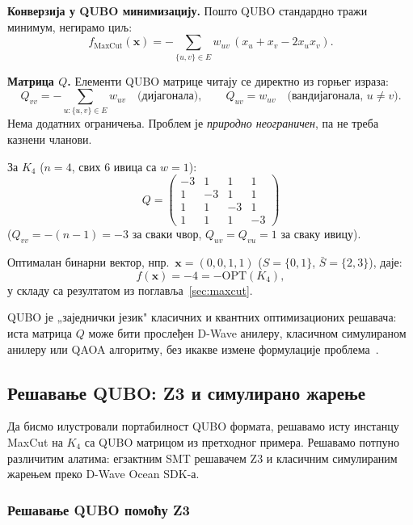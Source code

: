 \textbf{Конверзија у QUBO минимизацију.}
Пошто QUBO стандардно тражи минимум, негирамо циљ:
\[
  \boxed{
  f_{\mathrm{MaxCut}}(\mathbf{x})
  = -\sum_{\{u,v\} \in E} w_{uv}\,(x_u + x_v - 2x_u x_v).
  }
\]

\textbf{Матрица $Q$.}
Елементи QUBO матрице читају се директно из горњег израза:
\[
  Q_{vv} = -\sum_{u:\{u,v\}\in E} w_{uv}
  \quad\text{(дијагонала)},
  \qquad
  Q_{uv} = w_{uv}
  \quad\text{(ванд‌ијагонала, $u \neq v$)}.
\]
Нема додатних ограничења. Проблем је \emph{природно неограничен},
па не треба казнени чланови.

\begin{example}
За $K_4$ ($n = 4$, свих $6$ ивица са $w = 1$):
\[
  Q =
  \begin{pmatrix}
   -3 &  1 &  1 &  1 \\
    1 & -3 &  1 &  1 \\
    1 &  1 & -3 &  1 \\
    1 &  1 &  1 & -3
  \end{pmatrix}
\]
($Q_{vv} = -(n-1) = -3$ за сваки чвор,
$Q_{uv} = Q_{vu} = 1$ за сваку ивицу).

Оптималан бинарни вектор, нпр.\ $\mathbf{x} = (0,0,1,1)$
($S = \{0,1\}$, $\bar S = \{2,3\}$), даје:
\[
  f(\mathbf{x}) = -4 = -\mathrm{OPT}(K_4),
\]
у складу са резултатом из поглавља~\ref{sec:maxcut}.
\end{example}


\begin{remark}
QUBO је „заједнички језик" класичних и квантних оптимизационих
решавача: иста матрица $Q$ може бити прослеђен D-Wave анилеру,
класичном симулираном анилеру или QAOA алгоритму, без
икакве измене формулације проблема~\cite{mcgeoch2014}.
\end{remark}

\subsection{Решавање QUBO: Z3 и симулирано жарење}

Да бисмо илустровали портабилност QUBO формата, решавамо исту
инстанцу MaxCut на $K_4$ са QUBO матрицом из претходног примера.
Решавамо потпуно различитим алатима: егзактним SMT решавачем Z3
и класичним симулираним жарењем преко D-Wave Ocean SDK-а.

\subsubsection{Решавање QUBO помоћу Z3}

